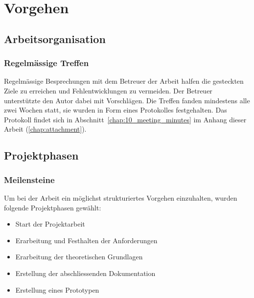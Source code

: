 
\chapter{Vorgehen}
\label{chap:procedure}

\section{Arbeitsorganisation}
\label{sec:organization}

\subsection{Regelmässige Treffen}
\label{subsec:meetings}

Regelmässige Besprechungen mit dem Betreuer der Arbeit halfen die
gesteckten Ziele zu erreichen und Fehlentwicklungen zu vermeiden. Der
Betreuer unterstützte den Autor dabei mit Vorschlägen. Die Treffen
fanden mindestens alle zwei Wochen statt, sie wurden in Form eines
Protokolles festgehalten. Das Protokoll findet sich in
Abschnitt~\ref{chap:10_meeting_minutes} im Anhang dieser Arbeit
(\ref{chap:attachment}).

\section{Projektphasen}
\label{sec:project_schedule}

\subsection{Meilensteine}
\label{subsec:milestones}

Um bei der Arbeit ein möglichst strukturiertes Vorgehen einzuhalten, wurden folgende Projektphasen gewählt:
\begin{itemize}
    \item Start der Projektarbeit
    \item Erarbeitung und Festhalten der Anforderungen
    \item Erarbeitung der theoretischen Grundlagen
    \item Erstellung der abschliessenden Dokumentation
    \item Erstellung eines Prototypen
\end{itemize}

